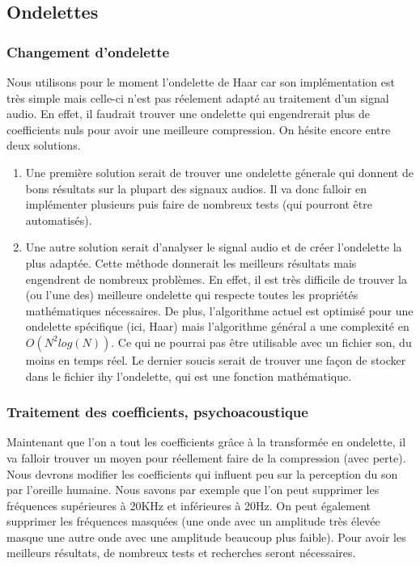 \documentclass[a4paper,12pt]{article}
\begin{document}
	\subsection{Ondelettes}
\subsubsection{Changement d'ondelette}
Nous utilisons pour le moment l'ondelette de Haar car son
implémentation est très simple mais celle-ci n'est pas réelement
adapté au traitement d'un signal audio. En effet, il faudrait trouver
une ondelette qui engendrerait plus de coefficients nuls pour avoir
une meilleure compression. On hésite encore entre deux solutions.\\
\begin{enumerate}
\item 
  Une première solution serait de trouver une ondelette génerale qui
  donnent de bons résultats sur la plupart des signaux audios. Il va
  donc falloir en implémenter plusieurs puis faire de nombreux tests
  (qui pourront être automatisés).  
\item 
  Une autre solution serait d'analyser le signal audio et de créer
  l'ondelette la plus adaptée. Cette méthode donnerait les meilleurs
  résultats mais engendrent de nombreux problèmes. En effet, il est
  très difficile de trouver la (ou l'une des) meilleure ondelette qui
  respecte toutes les propriétés mathématiques nécessaires. De plus,
  l'algorithme actuel est optimisé pour une ondelette spécifique (ici,
  Haar) mais l'algorithme général a une complexité en $O\left(N^2 log\left
  (N\right)\right)$.
  Ce qui ne pourrai pas être utilisable avec un fichier son, du
  moins en temps réel. Le dernier soucis serait de trouver une façon
  de stocker dans le fichier ihy l'ondelette, qui est une fonction
  mathématique.
\end{enumerate}
\subsubsection{Traitement des coefficients, psychoacoustique}
Maintenant que l'on a tout les coefficients grâce à la transformée en
ondelette, il va falloir trouver un moyen pour réellement faire de la
compression (avec perte). Nous devrons modifier les coefficients qui
influent peu sur la perception du son par l'oreille humaine. Nous
savons par exemple que l'on peut supprimer les fréquences supérieures à
20KHz et inférieures à 20Hz. On peut également supprimer les fréquences
masquées (une onde avec un amplitude très élevée masque une autre onde
avec une amplitude beaucoup plus faible). Pour avoir les meilleurs
résultats, de nombreux tests et recherches seront nécessaires.
\end{document}

